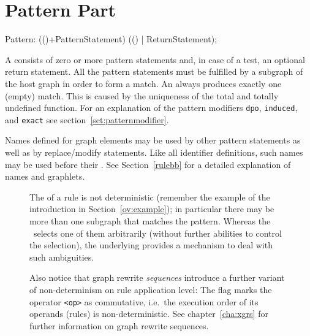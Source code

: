\section{Pattern Part}
\label{patternpart}
\begin{rail}
  Pattern: (()+PatternStatement) (() | ReturnStatement);
\end{rail}
A  consists of zero or more pattern statements and, in case of a test, an optional return statement.
All the pattern statements must be fulfilled by a subgraph of the host graph in order to form a match. 
An  always produces exactly one (empty) match. 
This is caused by the uniqueness of the total and totally undefined function.
For an explanation of the pattern modifiers \texttt{dpo}, \texttt{induced}, and \texttt{exact} see section~\ref{sct:patternmodifier}.

Names defined for graph elements may be used by other pattern statements as well as by replace/modify statements. 
Like all identifier definitions, such names may be used before their . 
See Section~\ref{rulebb} for a detailed explanation of names and graphlets.
\begin{figure}[htbp]
\begin{note}
\label{note:indeterminism}
The  of a rule is not deterministic (remember the example of the introduction in Section~\ref{ov:example}); in particular there may be more than one subgraph that matches the pattern. 
Whereas the \GrShell\ selects one of them arbitrarily (without further abilities to control the selection), the underlying \LibGr{} provides a mechanism to deal with such ambiguities. 

Also notice that graph rewrite \emph{sequences} introduce a further variant of non-determinism on rule application level: 
The  flag marks the operator \texttt{<op>} as commutative, i.e.\ the execution order of its operands (rules) is non-deterministic. 
See chapter~\ref{cha:xgrs} for further information on graph rewrite sequences.
\end{note}
\end{figure}

